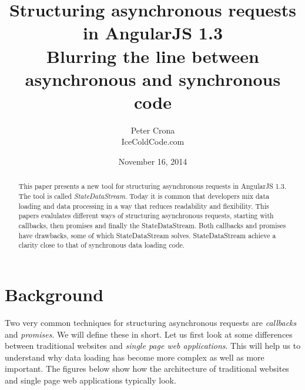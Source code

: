 \documentclass[a4paper,12pt]{article}
\begin{document}
\graphicspath{ {./images/} }

\lstset{
   language=JavaScript,
   extendedchars=true,
   basicstyle=\footnotesize\ttfamily,
   showstringspaces=false,
   showspaces=false,
   numbers=left,
   numberstyle=\footnotesize,
   numbersep=9pt,
   tabsize=2,
   breaklines=true,
   showtabs=false,
   captionpos=b
}

\title{Structuring asynchronous requests in AngularJS 1.3 \\ \vspace{-2 mm} {\small Blurring the line between asynchronous and synchronous code}}
\date{November 16, 2014}
\author{Peter Crona\\ IceColdCode.com}
\maketitle

\begin{abstract}
This paper presents a new tool for structuring asynchronous requests in AngularJS 1.3. The tool is
called \emph{StateDataStream}. Today it is common that developers mix data loading and data processing in a way that reduces readability and flexibility. 
This papers evalulates different ways of structuring asynchronous requests, starting with callbacks, then promises and finally the StateDataStream.
Both callbacks and promises have drawbacks, some of which StateDataStream solves. StateDataStream achieve a clarity close to that of synchronous data loading code.
\end{abstract}
\clearpage

\afterpage{\null\newpage}
\clearpage

\tableofcontents
\clearpage

\afterpage{\null\newpage}
\clearpage

\section{Background}
Two very common techniques for structuring asynchronous requests are \emph{callbacks} and \emph{promises}.
We will define these in short. Let us first look at some differences between traditional websites and \emph{single page web applications}.
This will help us to understand why data loading has become more complex as well as more important.
The figures below show how the architecture of traditional websites and single page web applications typically look.
\end{document}
